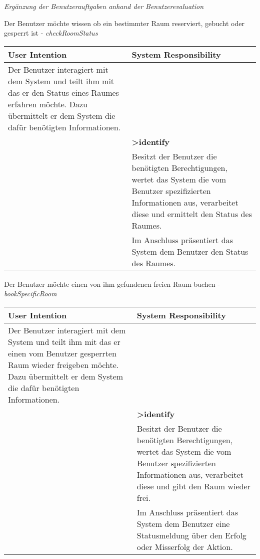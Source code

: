 \newpage
\textit{Ergänzung der Benutzerauftgaben anhand der Benutzerevaluation}
\begin{table}[h]
	Der Benutzer möchte wissen ob ein bestimmter Raum reserviert, gebucht oder gesperrt ist - \textit{checkRoomStatus}\\
	\begin{tabularx}{\textwidth}{|X|X|}
	\rowcolor{heading} \textbf{User Intention} & \textbf{System Responsibility}\\ \hline
	Der Benutzer interagiert mit dem System und teilt ihm mit das er den Status eines Raumes erfahren möchte. Dazu übermittelt er dem System die dafür benötigten Informationen. & \\  \hline
	 & \textbf{>identify} \\ \hline
	 & Besitzt der Benutzer die benötigten Berechtigungen, wertet das System die vom Benutzer spezifizierten Informationen aus, verarbeitet diese und ermittelt den Status des Raumes.\\ \hline
	 & Im Anschluss präsentiert das System dem Benutzer den Status des Raumes.\\ \hline
	\end{tabularx}
	
	Der Benutzer möchte einen von ihm gefundenen freien Raum buchen - \textit{bookSpecificRoom}\\
	\begin{tabularx}{\textwidth}{|X|X|}
	\rowcolor{heading} \textbf{User Intention} & \textbf{System Responsibility}\\ \hline
	Der Benutzer interagiert mit dem System und teilt ihm mit das er einen vom Benutzer gesperrten Raum wieder freigeben möchte. Dazu übermittelt er dem System die dafür benötigten Informationen. & \\  \hline
	 & \textbf{>identify} \\ \hline
	 & Besitzt der Benutzer die benötigten Berechtigungen, wertet das System die vom Benutzer spezifizierten Informationen aus, verarbeitet diese und gibt den Raum wieder frei.\\ \hline
	 & Im Anschluss präsentiert das System dem Benutzer eine Statusmeldung über den Erfolg oder Misserfolg der Aktion. \\ \hline
	\end{tabularx}
\end{table}


